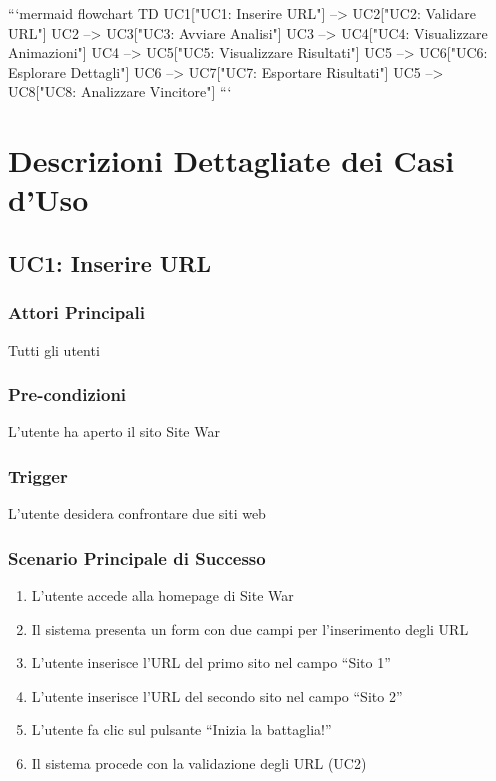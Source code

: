 ```mermaid
flowchart TD
    UC1["UC1: Inserire URL"] --> UC2["UC2: Validare URL"]
    UC2 --> UC3["UC3: Avviare Analisi"]
    UC3 --> UC4["UC4: Visualizzare Animazioni"]
    UC4 --> UC5["UC5: Visualizzare Risultati"]
    UC5 --> UC6["UC6: Esplorare Dettagli"]
    UC6 --> UC7["UC7: Esportare Risultati"]
    UC5 --> UC8["UC8: Analizzare Vincitore"]
```

\section{Descrizioni Dettagliate dei Casi d'Uso}

\subsection{UC1: Inserire URL}

\subsubsection{Attori Principali}
Tutti gli utenti

\subsubsection{Pre-condizioni}
L'utente ha aperto il sito Site War

\subsubsection{Trigger}
L'utente desidera confrontare due siti web

\subsubsection{Scenario Principale di Successo}
\begin{enumerate}
    \item L'utente accede alla homepage di Site War
    \item Il sistema presenta un form con due campi per l'inserimento degli URL
    \item L'utente inserisce l'URL del primo sito nel campo ``Sito 1''
    \item L'utente inserisce l'URL del secondo sito nel campo ``Sito 2''
    \item L'utente fa clic sul pulsante ``Inizia la battaglia!''
    \item Il sistema procede con la validazione degli URL (UC2)
\end{enumerate}

